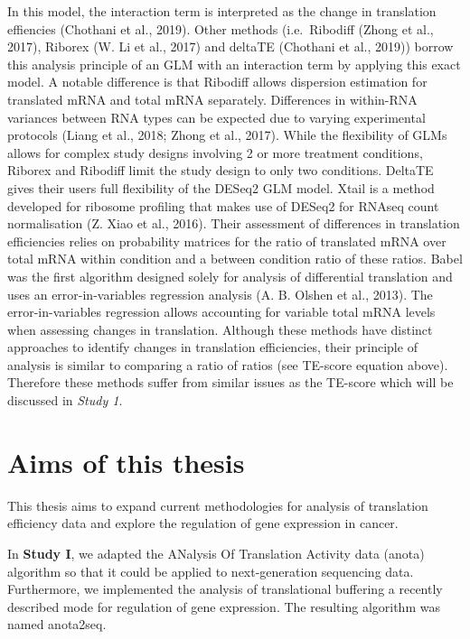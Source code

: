 \documentclass[12pt,openany]{book}
\begin{document}
In this model, the interaction term is interpreted as the change in
translation effiencies (Chothani et al., 2019). Other methods
(i.e.~Ribodiff (Zhong et al., 2017), Riborex (W. Li et al., 2017) and
deltaTE (Chothani et al., 2019)) borrow this analysis principle of an
GLM with an interaction term by applying this exact model. A notable
difference is that Ribodiff allows dispersion estimation for translated
mRNA and total mRNA separately. Differences in within-RNA variances
between RNA types can be expected due to varying experimental protocols
(Liang et al., 2018; Zhong et al., 2017). While the flexibility of GLMs
allows for complex study designs involving 2 or more treatment
conditions, Riborex and Ribodiff limit the study design to only two
conditions. DeltaTE gives their users full flexibility of the DESeq2 GLM
model. Xtail is a method developed for ribosome profiling that makes use
of DESeq2 for RNAseq count normalisation (Z. Xiao et al., 2016). Their
assessment of differences in translation efficiencies relies on
probability matrices for the ratio of translated mRNA over total mRNA
within condition and a between condition ratio of these ratios. Babel
was the first algorithm designed solely for analysis of differential
translation and uses an error-in-variables regression analysis (A. B.
Olshen et al., 2013). The error-in-variables regression allows
accounting for variable total mRNA levels when assessing changes in
translation. Although these methods have distinct approaches to identify
changes in translation efficiencies, their principle of analysis is
similar to comparing a ratio of ratios (see TE-score equation above).
Therefore these methods suffer from similar issues as the TE-score which
will be discussed in \emph{Study 1}.

\chapter{Aims of this thesis}

This thesis aims to expand current methodologies for analysis of
translation efficiency data and explore the regulation of gene
expression in cancer.

In \textbf{Study I}, we adapted the ANalysis Of Translation Activity
data (anota) algorithm so that it could be applied to next-generation
sequencing data. Furthermore, we implemented the analysis of
translational buffering a recently described mode for regulation of gene
expression. The resulting algorithm was named anota2seq.
\end{document}
